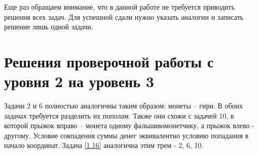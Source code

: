 Еще раз обращаем внимание, что в данной работе не требуется приводить решения всех задач. Для успешной сдали нужно указать аналогии и записать решение лишь одной задачи.

\section{ Решения проверочной работы с уровня 2 на уровень 3}
%
%

Задачи 2 и 6 полностью аналогичны таким образом: монеты -- гири. В обоих задачах требуется разделить их пополам. Также они схожи с задачей 10, в которой прыжок вправо -- монета одному фальшивомонетчику, а прыжок влево - другому. Условие совпадения суммы денег эквивалентно условию попадания в начало координат.
Задача \ref{1.16} аналогична этим трем - 2, 6, 10.

%
%	

